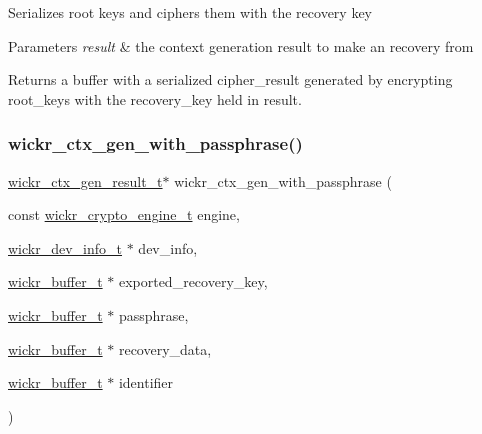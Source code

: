 Serializes root keys and ciphers them with the recovery key


\begin{DoxyParams}{Parameters}
{\em result} & the context generation result to make an recovery from \\
\hline
\end{DoxyParams}
\begin{DoxyReturn}{Returns}
a buffer with a serialized cipher\+\_\+result generated by encrypting \textquotesingle{}root\+\_\+keys\textquotesingle{} with the \textquotesingle{}recovery\+\_\+key\textquotesingle{} held in \textquotesingle{}result\textquotesingle{}. 
\end{DoxyReturn}
\mbox{\label{group__wickr__ctx_gaab0b2731d76d6ea91afd1b147c53a29a}} 
\subsubsection{\texorpdfstring{wickr\+\_\+ctx\+\_\+gen\+\_\+with\+\_\+passphrase()}{wickr\_ctx\_gen\_with\_passphrase()}}
{\footnotesize\ttfamily \hyperlink{structwickr__ctx__gen__result}{wickr\+\_\+ctx\+\_\+gen\+\_\+result\+\_\+t}$\ast$ wickr\+\_\+ctx\+\_\+gen\+\_\+with\+\_\+passphrase (\begin{DoxyParamCaption}\item[{const \hyperlink{structwickr__crypto__engine}{wickr\+\_\+crypto\+\_\+engine\+\_\+t}}]{engine,  }\item[{\hyperlink{structwickr__dev__info}{wickr\+\_\+dev\+\_\+info\+\_\+t} $\ast$}]{dev\+\_\+info,  }\item[{\hyperlink{structwickr__buffer}{wickr\+\_\+buffer\+\_\+t} $\ast$}]{exported\+\_\+recovery\+\_\+key,  }\item[{\hyperlink{structwickr__buffer}{wickr\+\_\+buffer\+\_\+t} $\ast$}]{passphrase,  }\item[{\hyperlink{structwickr__buffer}{wickr\+\_\+buffer\+\_\+t} $\ast$}]{recovery\+\_\+data,  }\item[{\hyperlink{structwickr__buffer}{wickr\+\_\+buffer\+\_\+t} $\ast$}]{identifier }\end{DoxyParamCaption})}

